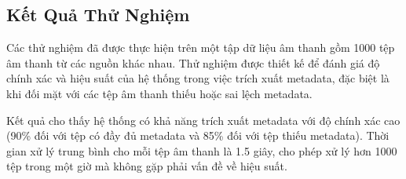\documentclass[conference]{IEEEtran}
\begin{document}
\subsection{Kết Quả Thử Nghiệm}
Các thử nghiệm đã được thực hiện trên một tập dữ liệu âm thanh gồm 1000 tệp âm thanh từ các nguồn khác nhau. Thử nghiệm được thiết kế để đánh giá độ chính xác và hiệu suất của hệ thống trong việc trích xuất metadata, đặc biệt là khi đối mặt với các tệp âm thanh thiếu hoặc sai lệch metadata.

Kết quả cho thấy hệ thống có khả năng trích xuất metadata với độ chính xác cao (90\% đối với tệp có đầy đủ metadata và 85\% đối với tệp thiếu metadata). Thời gian xử lý trung bình cho mỗi tệp âm thanh là 1.5 giây, cho phép xử lý hơn 1000 tệp trong một giờ mà không gặp phải vấn đề về hiệu suất.
\end{document}
